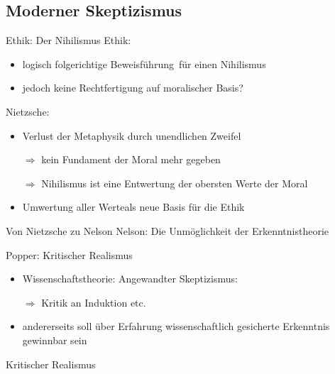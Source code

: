 \documentclass[12pt]{beamer}
\begin{document}
\subsection{Moderner Skeptizismus}
\begin{frame}{Ethik: Der Nihilismus}
Ethik:\\
\begin{itemize}
\item logisch folgerichtige \glqq Beweisführung\grqq\ für einen Nihilismus
\item jedoch keine Rechtfertigung auf moralischer Basis?
\end{itemize}
Nietzsche:\\
\begin{itemize}
\item Verlust der Metaphysik durch unendlichen Zweifel
\item[$\Rightarrow$] kein Fundament der Moral mehr gegeben
\item[$\Rightarrow$] Nihilismus ist eine Entwertung der obersten Werte der Moral
\item \glqq Umwertung aller Werte\grqq als neue Basis für die Ethik
\end{itemize}
\end{frame}

\begin{frame}{Von Nietzsche zu Nelson}
Nelson: \glqq Die Unmöglichkeit der Erkenntnistheorie\grqq
\end{frame}

\begin{frame}{Popper: Kritischer Realismus}
\begin{itemize}
\item Wissenschaftstheorie: Angewandter Skeptizismus:
\item[$\Rightarrow$] Kritik an Induktion etc.
\item andererseits soll über Erfahrung wissenschaftlich gesicherte Erkenntnis gewinnbar sein
\end{itemize}
\glqq Kritischer Realismus\grqq
\end{frame}
\end{document}
